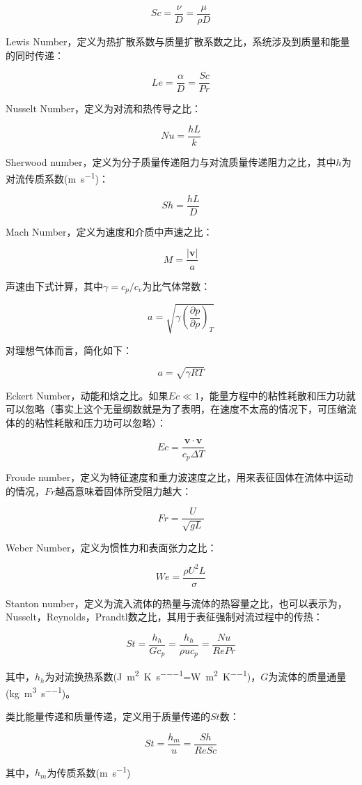 \[ Sc = \frac{\nu}{D} = \frac{\mu}{\rho D} \]

Lewis Number，定义为热扩散系数与质量扩散系数之比，系统涉及到质量和能量的同时传递：

\[Le = \frac{\alpha}{D} = \frac{Sc}{Pr}\]

Nusselt Number，定义为对流和热传导之比：

\[Nu = \frac{hL}{k}\]

Sherwood number，定义为分子质量传递阻力与对流质量传递阻力之比，其中$ h $为对流传质系数(\si{\meter\per\second})：

\[Sh = \frac{hL}{D}\]

Mach Number，定义为速度和介质中声速之比：

\[ M = \frac{|\mathbf{v}|}{a} \]

声速由下式计算，其中$ \gamma=c_p/c_v $为比气体常数：

\[a=\sqrt{\gamma\left( \frac{\partial p}{\partial \rho} \right)_T}\]

对理想气体而言，简化如下：

\[a=\sqrt{\gamma RT}\]

Eckert Number，动能和焓之比。如果$ Ec\ll 1 $，能量方程中的粘性耗散和压力功就可以忽略（事实上这个无量纲数就是为了表明，在速度不太高的情况下，可压缩流体的的粘性耗散和压力功可以忽略）：

\[Ec=\frac{\mathbf{v\cdot v}}{c_p\Delta T}\]

Froude number，定义为特征速度和重力波速度之比，用来表征固体在流体中运动的情况，$ Fr $越高意味着固体所受阻力越大：

\[Fr = \frac{U}{\sqrt{gL}}\]

Weber Number，定义为惯性力和表面张力之比：

\[We=\frac{\rho U^2 L}{\sigma}\]

Stanton number，定义为流入流体的热量与流体的热容量之比，也可以表示为，Nusselt，Reynolds，Prandtl数之比，其用于表征强制对流过程中的传热：

\[ St = \frac{h_h}{Gc_p} = \frac{h_h}{\rho u c_p} = \frac{Nu}{RePr} \]

其中，$ h_h $为对流换热系数(\si{\joule\per\meter\squared\per\kelvin\per\second}=\si{\watt\per\meter\squared\per\kelvin})，$ G $为流体的质量通量(\si{\kg\per\meter\cubed\per\second})。

类比能量传递和质量传递，定义用于质量传递的$ St $数：

\[ St = \frac{h_m}{u} = \frac{Sh}{ReSc} \]

其中，$ h_m $为传质系数(\si{\meter\per\second})

